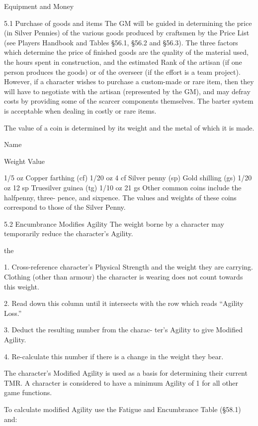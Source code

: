 \begin{Chapter}{Equipment and Money}

5.1 Purchase of goods and items 
The GM will be guided in determining the price (in 
Silver  Pennies)  of  the  various  goods  produced  by 
craftsmen by the Price List (see Players Handbook 
and  Tables  §56.1,  §56.2  and  §56.3).  The  three 
factors which determine the price of finished goods 
are the quality of the material used, the hours spent 
in  construction,  and  the  estimated  Rank  of  the 
artisan (if one person produces the goods) or of the 
overseer (if the effort is a team project). However, 
if a character wishes to purchase a custom-made or 
rare item, then they will have to negotiate with the 
artisan  (represented  by  the  GM),  and  may  defray 
costs by providing some of the scarcer components 
themselves.  The  barter  system  is  acceptable  when 
dealing in costly or rare items. 

The value of a coin is determined by its weight and 
the metal of which it is made. 

Name 

Weight  Value 

 

1/5 oz 
Copper farthing (cf) 
1/20 oz  4 cf 
Silver penny (sp) 
Gold shilling (gs) 
1/20 oz  12 sp 
Truesilver guinea (tg)  1/10 oz  21 gs 
Other  common  coins include  the  halfpenny,  three-
pence,  and  sixpence.  The  values  and  weights  of 
these  coins  correspond  to  those  of  the  Silver 
Penny. 

5.2 Encumbrance Modifies Agility 
The  weight  borne  by  a  character  may  temporarily 
reduce the character’s Agility. 

the 

1.  Cross-reference 
character’s  Physical 
Strength and the weight they are carrying. Clothing 
(other  than  armour)  the  character  is  wearing  does 
not count towards this weight. 

2.  Read  down  this  column  until  it  intersects  with 
the row which reads “Agility Loss.” 

3.  Deduct  the  resulting  number  from  the  charac-
ter’s Agility to give Modified Agility. 

4. Re-calculate  this  number  if  there  is  a  change  in 
the weight they bear. 

The character’s Modified Agility is used as a basis 
for  determining  their  current  TMR.  A  character  is 
considered to have a minimum Agility of 1 for all 
other game functions. 

To  calculate  modified  Agility  use  the  Fatigue  and 
Encumbrance Table (§58.1) and: 

\end{Chapter}
